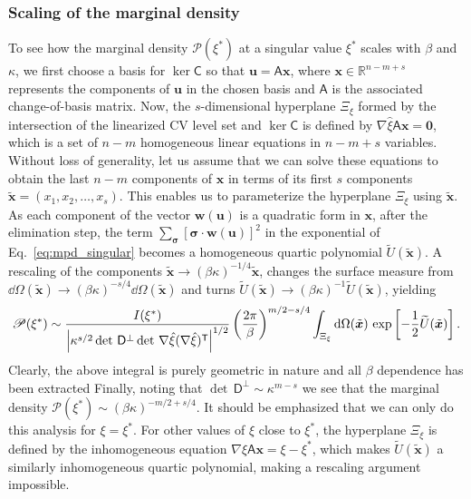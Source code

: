 \subsubsection{Scaling of the marginal density}
\label{sm:sec:scaling}

To see how the marginal density $\mathscr{P}(\xi^{*})$ at a singular value $\xi^{*}$ scales with $\beta$ and $\kappa$, we first choose a basis for $\ker\mathsf{C}$ so that $\bm{u} = \mathsf{A}\bm{x}$, where $\bm{x} \in \mathbb{R}^{n-m+s}$ represents the components of $\bm{u}$ in the chosen basis and $\mathsf{A}$ is the associated change-of-basis matrix.
Now, the $s$-dimensional hyperplane $\Xi_{\xi}$ formed by the intersection of the linearized CV level set and $\ker\mathsf{C}$ is defined by $\nabla\hat{\xi}\mathsf{A}\bm{x} = \bm{0}$, which is a set of $n-m$ homogeneous linear equations in $n-m+s$ variables.
Without loss of generality, let us assume that we can solve these equations to obtain the last $n - m$ components of $\bm{x}$ in terms of its first $s$ components $\tilde{\bm{x}} = (x_{1}, x_{2}, \ldots, x_{s})$.
This enables us to parameterize the hyperplane $\Xi_{\xi}$ using $\tilde{\bm{x}}$.
As each component of the vector $\bm{w}(\bm{u})$ is a quadratic form in $\bm{x}$, after the elimination step, the term $\sum_{\bm{\sigma}}[\bm{\sigma}\cdot\bm{w}(\bm{u})]^{2}$ in the exponential of Eq.~\eqref{eq:mpd_singular} becomes a homogeneous quartic polynomial $\widetilde{U}(\tilde{\bm{x}})$.
A rescaling of the components $\tilde{\bm{x}} \to (\beta\kappa)^{-1/4}\tilde{\bm{x}}$, changes the surface measure from $\dd\Omega(\tilde{\bm{x}}) \to (\beta\kappa)^{-s/4}\dd\Omega(\tilde{\bm{x}})$ and turns $\widetilde{U}(\tilde{\bm{x}}) \to (\beta\kappa)^{-1}\widetilde{U}(\tilde{\bm{x}})$, yielding
%
\begin{equation}
  \mathscr{P}(\xi^{*}) \sim \frac{I({\xi}^{*})}{\left|\kappa^{s/2}\det\,\mathsf{D}^\perp \det\, \nabla\hat{\xi}(\nabla\hat{\xi})^\mathsf{T}\right|^{1/2}}  \left(\frac{2\pi}{\beta}\right)^{m/2 - s/4} \int_{\Xi_{\xi}} \mathrm{d}\Omega(\tilde{\bm{x}})\, \exp\left[-\frac{1}{2}\widetilde{U}(\tilde{\bm{x}})\right].
  \label{sm:eq:scaling}
\end{equation}
%
Clearly, the above integral is purely geometric in nature and all $\beta$ dependence has been extracted
Finally, noting that $\det\,\mathsf{D}^{\perp} \sim \kappa^{m - s}$ we see that the marginal density $\mathscr{P}(\xi^{*}) \sim (\beta\kappa)^{-m/2 + s/4}$.
It should be emphasized that we can only do this analysis for $\xi = \xi^{*}$.
For other values of $\xi$ close to $\xi^{*}$, the hyperplane $\Xi_{\xi}$ is defined by the inhomogeneous equation $\nabla\hat{\xi}\mathsf{A}\bm{x} = \xi - \xi^{*}$, which makes $\widetilde{U}(\tilde{\bm{x}})$ a similarly inhomogeneous quartic polynomial, making a rescaling argument impossible.

